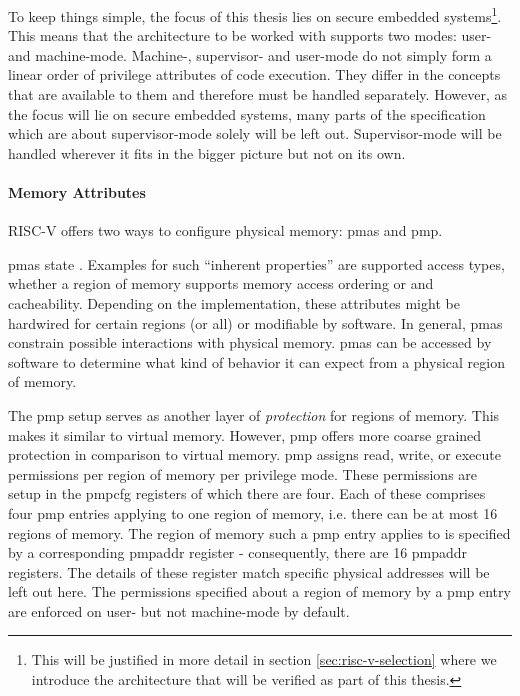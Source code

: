 To keep things simple, the focus of this thesis lies on secure embedded systems\footnote{%
    This will be justified in more detail in section \ref{sec:risc-v-selection} where we introduce the architecture that will be verified as part of this thesis.
}.
This means that the architecture to be worked with supports two modes: user- and machine-mode.
Machine-, supervisor- and user-mode do not simply form a linear order of privilege attributes of code execution.
They differ in the concepts that are available to them and therefore must be handled separately.
However, as the focus will lie on secure embedded systems, many parts of the specification which are about supervisor-mode solely will be left out.
Supervisor-mode will be handled wherever it fits in the bigger picture but not on its own.

\paragraph{Memory Attributes}
\label{sec:memory-attrs}

RISC-V offers two ways to configure physical memory: \glspl{pma} and \gls{pmp}.

\glspl{pma} state .
Examples for such \enquote{inherent properties} are supported access types, whether a region of memory supports memory access ordering or and cacheability.
Depending on the implementation, these attributes might be hardwired for certain regions (or all) or modifiable by software.
In general, \glspl{pma} constrain possible interactions with physical memory.
\glspl{pma} can be accessed by software to determine what kind of behavior it can expect from a physical region of memory.

The \gls{pmp} setup serves as another layer of \textit{protection} for regions of memory.
This makes it similar to virtual memory.
However, \gls{pmp} offers more coarse grained protection in comparison to virtual memory.
\gls{pmp} assigns read, write, or execute permissions per region of memory per privilege mode.
These permissions are setup in the \gls{pmpcfg} registers of which there are four.
Each of these comprises four \gls{pmp} entries applying to one region of memory, i.e. there can be at most 16 regions of memory.
The region of memory such a \gls{pmp} entry applies to is specified by a corresponding \gls{pmpaddr} register - consequently, there are 16 \gls{pmpaddr} registers.
The details of these register match specific physical addresses will be left out here.
The permissions specified about a region of memory by a \gls{pmp} entry are enforced on user- but not machine-mode by default.

